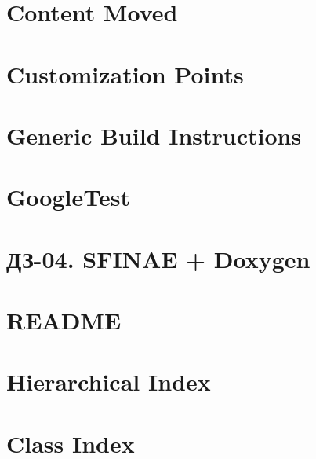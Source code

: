 \let\mypdfximage\pdfximage\def\pdfximage{\immediate\mypdfximage}\documentclass[twoside]{book}
\newcommand{\+}{\discretionary{\mbox{\scriptsize$\hookleftarrow$}}{}{}}
\begin{document}
\chapter{Content Moved}
\label{md_04_cmake_build_debug__deps_googletest_src_googletest_docs_README}

\chapter{Customization Points}
\label{md_04_cmake_build_debug__deps_googletest_src_googletest_include_gtest_internal_custom_README}

\chapter{Generic Build Instructions}
\label{md_04_cmake_build_debug__deps_googletest_src_googletest_README}

\chapter{Google\+Test}
\label{md_04_cmake_build_debug__deps_googletest_src_README}

\chapter{ДЗ-\/04. SFINAE + Doxygen}
\label{md_04_task_task}

\chapter{README}
\label{md_README}

\chapter{Hierarchical Index}

\chapter{Class Index}

\end{document}
